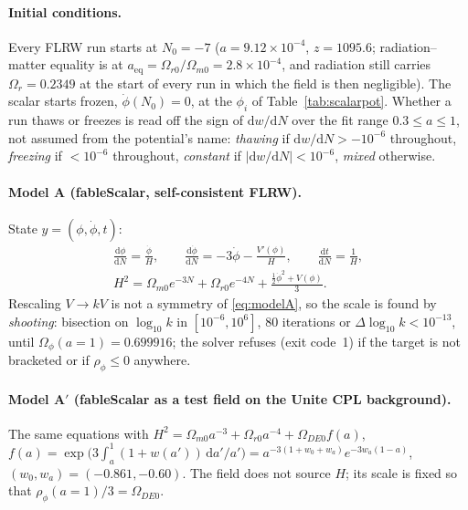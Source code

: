 \documentclass[11pt,a4paper]{article}
\newcommand{\fableScalar}{\textsf{fableScalar}}
\newcommand{\dd}{\mathrm{d}}
\begin{document}
\paragraph{Initial conditions.} Every FLRW run starts at $N_0=-7$ ($a=9.12\times10^{-4}$,
$z=1095.6$; radiation--matter equality is at $a_{\mathrm{eq}}=\Omega_{r0}/\Omega_{m0}=2.8\times10^{-4}$,
and radiation still carries $\Omega_r=0.2349$ at the start of every run in which the field is
then negligible). The scalar starts frozen,
$\dot\phi(N_0)=0$, at the $\phi_i$ of Table~\ref{tab:scalarpot}. Whether a run thaws or freezes is
read off the sign of $\dd w/\dd N$ over the fit range $0.3\le a\le1$, not assumed from the
potential's name: \emph{thawing} if $\dd w/\dd N>-10^{-6}$ throughout, \emph{freezing} if
$<10^{-6}$ throughout, \emph{constant} if $|\dd w/\dd N|<10^{-6}$, \emph{mixed} otherwise.

\paragraph{Model A (\fableScalar, self-consistent FLRW).} State $y=(\phi,\dot\phi,t)$:
\begin{equation}\label{eq:modelA}
\begin{gathered}
  \frac{\dd\phi}{\dd N}=\frac{\dot\phi}{H},\qquad
  \frac{\dd\dot\phi}{\dd N}=-3\dot\phi-\frac{V'(\phi)}{H},\qquad
  \frac{\dd t}{\dd N}=\frac1H,\\
  H^2=\Omega_{m0}e^{-3N}+\Omega_{r0}e^{-4N}+\frac{\tfrac12\dot\phi^2+V(\phi)}{3}.
\end{gathered}
\end{equation}
Rescaling $V\to kV$ is not a symmetry of \eqref{eq:modelA}, so the scale is found by
\emph{shooting}: bisection on $\log_{10}k$ in $[10^{-6},10^{6}]$, 80 iterations or
$\Delta\log_{10}k<10^{-13}$, until $\Omega_\phi(a=1)=0.699916$; the solver refuses (exit code~1)
if the target is not bracketed or if $\rho_\phi\le0$ anywhere.

\paragraph{Model A$'$ (\fableScalar{} as a test field on the Unite CPL background).} The same
equations with $H^2=\Omega_{m0}a^{-3}+\Omega_{r0}a^{-4}+\Omega_{DE0}f(a)$,
$f(a)=\exp\bigl(3\int_a^1(1+w(a'))\,\dd a'/a'\bigr)=a^{-3(1+w_0+w_a)}e^{-3w_a(1-a)}$,
$(w_0,w_a)=(-0.861,-0.60)$. The field does not source $H$; its scale is fixed so that
$\rho_\phi(a=1)/3=\Omega_{DE0}$.
\end{document}
